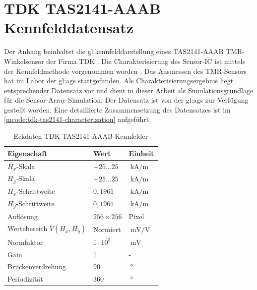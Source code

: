 %

\chapter{TDK TAS2141-AAAB Kennfelddatensatz}\label{ch:tdk-datensatz}

Der Anhang beinhaltet die \gls{gl:kennfeld}darstellung eines TAS2141-AAAB TMR-Winkelsensor der Firma TDK \cite{TDK2016}. Die Charakterisierung des Sensor-IC ist mittels der Kennfeldmethode vorgenommen worden \cite{Schuethe2019}. Das Ausmessen des TMR-Sensors hat im Labor der \gls{gl:ags} stattgefunden. Als Charakterisierungsergebnis liegt entsprechender Datensatz vor und dient in dieser Arbeit als Simulationsgrundlage für die Sensor-Array-Simulation. Der Datensatz ist von der \gls{gl:ags} zur Verfügung gestellt worden. Eine detaillierte Zusammensetzung des Datensatzes ist im \autoref{mcode:tdk-tas2141-characterization} aufgeführt.


\vspace{5mm}
\begin{table}[!htbp]
	\centering
	\begin{tabular}{l l l}
		\toprule
		\textbf{Eigenschaft}      & \textbf{Wert}    & \textbf{Einheit}                \\ \midrule
		$H_x$-Skala               & $-25 \ldots 25$  & $\SI{}{\kilo\ampere\per\metre}$ \\
		$H_y$-Skala               & $-25 \ldots 25$  & $\SI{}{\kilo\ampere\per\metre}$ \\ \hline
		$H_x$-Schrittweite        & $0,1961$         & $\SI{}{\kilo\ampere\per\metre}$ \\
		$H_y$-Schrittweite        & $0,1961$         & $\SI{}{\kilo\ampere\per\metre}$ \\ \hline
		Auflösung                 & $256 \times 256$ & Pixel                           \\
		Wertebereich $V(H_x,H_y)$ & Normiert         & $\SI{}{\milli\volt\per\volt}$   \\ \hline
		Normfaktor                & $1\cdot 10^3$    & $\SI{}{\milli\volt}$            \\
		Gain                      & 1                & -                               \\ \hline
		Brückenverdrehung         & 90               & $\SI{}{\degree}$                \\
		Periodizität              & 360              & $\SI{}{\degree}$                \\ \bottomrule
	\end{tabular}%
	\caption[Eckdaten TDK TAS2141-AAAB Kennfelder]{Eckdaten TDK TAS2141-AAAB Kennfelder}
\label{tab:tdk-char-data}
\end{table}


